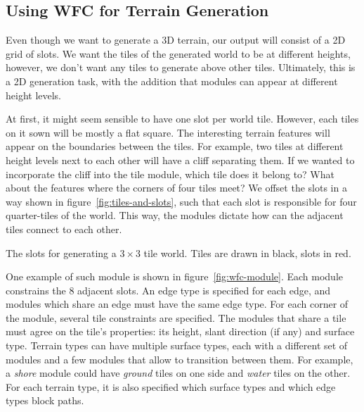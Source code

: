 \subsection{Using WFC for Terrain Generation}

Even though we want to generate a 3D terrain, our output will consist of a 2D grid of slots.
We want the tiles of the generated world to be at different heights, however, we don't want any tiles to generate above other tiles.
Ultimately, this is a 2D generation task, with the addition that modules can appear at different height levels.

At first, it might seem sensible to have one slot per world tile.
However, each tiles on it sown will be mostly a flat square.
The interesting terrain features will appear on the boundaries between the tiles.
For example, two tiles at different height levels next to each other will have a cliff separating them.
If we wanted to incorporate the cliff into the tile module, which tile does it belong to?
What about the features where the corners of four tiles meet?
We offset the slots in a way shown in figure~\ref{fig:tiles-and-slots}, such that each slot is responsible for four quarter-tiles of the world.
This way, the modules dictate how can the adjacent tiles connect to each other.

\begin{center}
    \captionsetup{type=figure}
    \caption{The slots for generating a $3\times3$ tile world. Tiles are drawn in black, slots in red.}
    \label{fig:tiles-and-slots}
\end{center}

One example of such module is shown in figure~\ref{fig:wfc-module}.
Each module constrains the 8 adjacent slots.
An edge type is specified for each edge, and modules which share an edge must have the same edge type.
For each corner of the module, several tile constraints are specified.
The modules that share a tile must agree on the tile's properties: its height, slant direction (if any) and surface type.
Terrain types can have multiple surface types, each with a different set of modules and a few modules that allow to transition between them.
For example, a \emph{shore} module could have \emph{ground} tiles on one side and \emph{water} tiles on the other.
For each terrain type, it is also specified which surface types and which edge types block paths.

